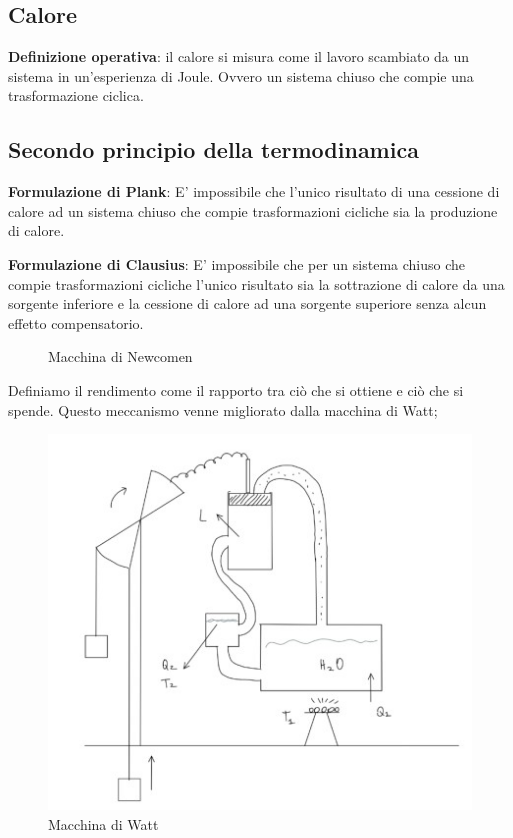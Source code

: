 \documentclass[a4paper]{article}
\numberwithin{equation}{section}%
\begin{document}
\subsection{Calore}
\textbf{Definizione operativa}: il calore si misura come il lavoro scambiato da un sistema in un'esperienza di Joule. Ovvero un sistema chiuso che compie una trasformazione ciclica. 

\subsection{Secondo principio della termodinamica}
\textbf{Formulazione di Plank}:
E' impossibile che l'unico risultato di una cessione di calore ad un sistema chiuso che compie trasformazioni cicliche sia la produzione di calore.

\textbf{Formulazione di Clausius}:
E' impossibile che per un sistema chiuso che compie trasformazioni cicliche l'unico risultato sia la sottrazione di calore da una sorgente inferiore e la cessione di calore ad una sorgente superiore senza alcun effetto compensatorio.

\begin{figure}[H]
	\begin{center}
		\caption{Macchina di Newcomen}
				 
	\end{center}
\end{figure}

Definiamo il rendimento come il rapporto tra ciò che si ottiene e ciò che si spende.
Questo meccanismo venne migliorato dalla macchina di Watt;

\begin{figure}[H]
	\begin{center}
		\caption{Macchina di Watt}
		\includegraphics[width=0.6\columnwidth]{macchinadiWatt.jpg}
	\end{center}
\end{figure}
\end{document}
